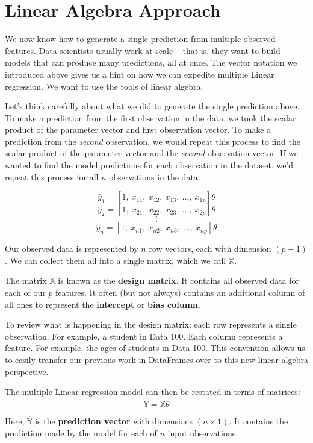 \documentclass[
  letterpaper,
  DIV=11,
  numbers=noendperiod]{scrreprt}
\begin{document}
\hypertarget{linear-algebra-approach}{%
\section{Linear Algebra Approach}\label{linear-algebra-approach}}

We now know how to generate a single prediction from multiple observed
features. Data scientists usually work at scale -- that is, they want to
build models that can produce many predictions, all at once. The vector
notation we introduced above gives us a hint on how we can expedite
multiple Linear regression. We want to use the tools of linear algebra.

Let's think carefully about what we did to generate the single
prediction above. To make a prediction from the first observation in the
data, we took the scalar product of the parameter vector and first
observation vector. To make a prediction from the \emph{second}
observation, we would repeat this process to find the scalar product of
the parameter vector and the \emph{second} observation vector. If we
wanted to find the model predictions for each observation in the
dataset, we'd repeat this process for all \(n\) observations in the
data.

\[\hat{y}_1 = [1,\:x_{11},\:x_{12},\:x_{13},\:...,\:x_{1p}] \theta\]
\[\hat{y}_2 = [1,\:x_{21},\:x_{22},\:x_{23},\:...,\:x_{2p}] \theta\]
\[\vdots\]
\[\hat{y}_n = [1,\:x_{n1},\:x_{n2},\:x_{n3},\:...,\:x_{np}] \theta\]

Our observed data is represented by \(n\) row vectors, each with
dimension \((p+1)\). We can collect them all into a single matrix, which
we call \(\mathbb{X}\).

The matrix \(\mathbb{X}\) is known as the \textbf{design matrix}. It
contains all observed data for each of our \(p\) features. It often (but
not always) contains an additional column of all ones to represent the
\textbf{intercept} or \textbf{bias column}.

To review what is happening in the design matrix: each row represents a
single observation. For example, a student in Data 100. Each column
represents a feature. For example, the ages of students in Data 100.
This convention allows us to easily transfer our previous work in
DataFrames over to this new linear algebra perspective.

The multiple Linear regression model can then be restated in terms of
matrices: \[\mathbb{\hat{Y}} = \mathbb{X} \theta\]

Here, \(\mathbb{\hat{Y}}\) is the \textbf{prediction vector} with
dimensions \((n \times 1)\). It contains the prediction made by the
model for each of \(n\) input observations.
\end{document}
